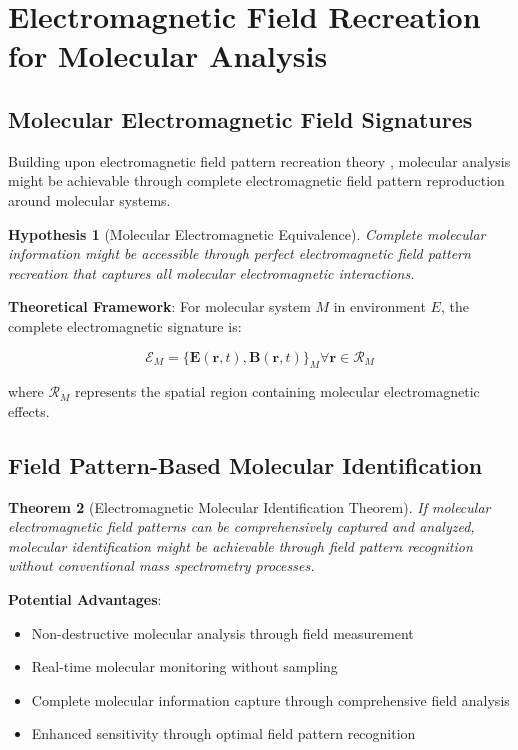 \documentclass[11pt,a4paper]{article}
\newtheorem{theorem}{Theorem}[section]
\newtheorem{hypothesis}[theorem]{Hypothesis}
\theoremstyle{remark}
\begin{document}
\section{Electromagnetic Field Recreation for Molecular Analysis}

\subsection{Molecular Electromagnetic Field Signatures}

Building upon electromagnetic field pattern recreation theory \cite{sachikonye2024electromagnetic}, molecular analysis might be achievable through complete electromagnetic field pattern reproduction around molecular systems.

\begin{hypothesis}[Molecular Electromagnetic Equivalence]
Complete molecular information might be accessible through perfect electromagnetic field pattern recreation that captures all molecular electromagnetic interactions.
\end{hypothesis}

\textbf{Theoretical Framework}: For molecular system $M$ in environment $E$, the complete electromagnetic signature is:

$$\mathcal{E}_M = \{\mathbf{E}(\mathbf{r}, t), \mathbf{B}(\mathbf{r}, t)\}_M \forall \mathbf{r} \in \mathcal{R}_M$$

where $\mathcal{R}_M$ represents the spatial region containing molecular electromagnetic effects.

\subsection{Field Pattern-Based Molecular Identification}

\begin{theorem}[Electromagnetic Molecular Identification Theorem]
If molecular electromagnetic field patterns can be comprehensively captured and analyzed, molecular identification might be achievable through field pattern recognition without conventional mass spectrometry processes.
\end{theorem}

\textbf{Potential Advantages}:
\begin{itemize}
\item Non-destructive molecular analysis through field measurement
\item Real-time molecular monitoring without sampling
\item Complete molecular information capture through comprehensive field analysis
\item Enhanced sensitivity through optimal field pattern recognition
\end{itemize}
\end{document}
